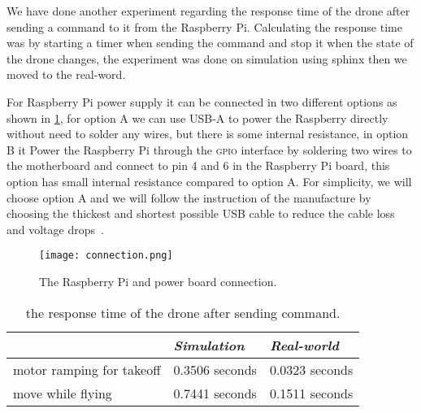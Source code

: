 \documentclass[../main.tex]{subfiles}
\begin{document}
We have done another experiment regarding the response time of the drone after sending a command to it from the Raspberry Pi. Calculating the response time was by starting a timer when sending the command and stop it when the state of the drone changes, the experiment was done on simulation using sphinx then we moved to the real-word.

For Raspberry Pi power supply it can be connected in 
two different options as shown in \cref{fig:connection}, 
for option A we can use USB-A to power the Raspberry directly without
need to solder any wires,
but there is some internal resistance,
in option B it Power the Raspberry Pi through the \textsc{gpio} 
interface by soldering two wires to the motherboard and 
connect to pin 4 and 6 in the Raspberry Pi board,
this option has small internal resistance compared to option A.
For simplicity, we will choose option A and we will 
follow the instruction of the manufacture by choosing 
the thickest and shortest possible USB cable to reduce 
the cable loss and voltage drops~\cite{makerfocus}.

 	 
 
 \begin{figure}[h]
 	\centering
 	\texttt{[image: connection.png]}
 	\caption{The Raspberry Pi and power board connection.}
 	\label{fig:connection}
 \end{figure}   

\begin{table}[H]
	\centering
	\caption{the response time of the drone after sending command.}
	\label{tab:respone-time}
	\begin{tabular}{ p{6cm} p{4cm} p{4cm} }
		\toprule
		\textit{} & \textit{Simulation} & \textit{Real-world}\\ \midrule
		motor ramping for takeoff  & 0.3506 seconds & 0.0323 seconds    \\
		move while flying & 0.7441 seconds & 0.1511 seconds  \\
		\bottomrule
	\end{tabular}
\end{table} 
\end{document}

